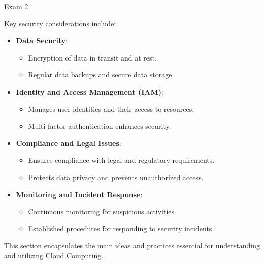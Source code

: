 \begin{examnotes}{Exam 2}
    \begin{highlight}
        Key security considerations include:
        
        \begin{itemize}
            \item \textbf{Data Security}:
                \begin{itemize}
                    \item Encryption of data in transit and at rest.
                    \item Regular data backups and secure data storage.
                \end{itemize}
            \item \textbf{Identity and Access Management (IAM)}:
                \begin{itemize}
                    \item Manages user identities and their access to resources.
                    \item Multi-factor authentication enhances security.
                \end{itemize}
            \item \textbf{Compliance and Legal Issues}:
                \begin{itemize}
                    \item Ensures compliance with legal and regulatory requirements.
                    \item Protects data privacy and prevents unauthorized access.
                \end{itemize}
            \item \textbf{Monitoring and Incident Response}:
                \begin{itemize}
                    \item Continuous monitoring for suspicious activities.
                    \item Established procedures for responding to security incidents.
                \end{itemize}
        \end{itemize}
    \end{highlight}
    
    \begin{highlight}
        This section encapsulates the main ideas and practices essential for understanding and utilizing Cloud Computing.
        

\end{highlight}
\end{examnotes}
